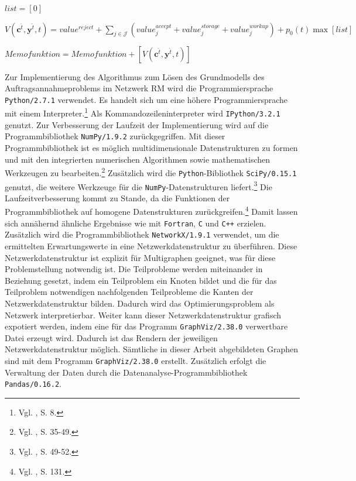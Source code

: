 \begin{algorithm}[H]
{{{			}
			$list = [0]$\\
			
		$V(\textbf{c}^{\hat t},\textbf{y}^{\hat t},t)=value^{reject} + \sum_{j\in\mathcal{J}}(value_j^{accept}+value_j^{storage}+value_j^{workup})+p_0(t)\max [list]$}
	$Memofunktion = Memofunktion+[V(\textbf{c}^{\hat t},\textbf{y}^{\hat t},t)]$}
\end{algorithm}

Zur Implementierung des Algorithmus zum Lösen des Grundmodells des Auftragsannahmeproblems im Netzwerk RM wird die Programmiersprache \texttt{Python/2.7.1} verwendet. Es handelt sich um eine höhere Programmiersprache mit einem Interpreter.\footnote{Vgl. \cite{:2005aa}, S. 8.} Als  Kommandozeileninterpreter wird \texttt{IPython/3.2.1} genutzt. Zur Verbesserung der Laufzeit der Implementierung wird auf die Programmbibliothek \texttt{NumPy/}\texttt{1.9.2} zurückgegriffen. Mit dieser Programmbibliothek ist es möglich multidimensionale Datenstrukturen zu formen und mit den integrierten numerischen Algorithmen sowie mathematischen Werkzeugen zu bearbeiten.\footnote{Vgl. \cite{lindblad2013numpy}, S. 35-49.} Zusätzlich wird die \texttt{Python}-Bibliothek \texttt{SciPy/0.15.1} genutzt, die weitere Werkzeuge für die \texttt{NumPy}-Datenstrukturen liefert.\footnote{Vgl. \cite{lindblad2013numpy}, S. 49-52.} Die Laufzeitverbesserung kommt zu Stande, da die Funktionen der Programmbibliothek auf homogene Datenstrukturen zurückgreifen.\footnote{Vgl. \cite{:2006aa}, S. 131.} Damit lassen sich annähernd ähnliche Ergebnisse wie mit \texttt{Fortran}, \texttt{C} und \texttt{C++} erzielen. Zusätzlich wird die Programmbibliothek \texttt{NetworkX/1.9.1} verwendet, um die ermittelten Erwartungswerte in eine Netzwerkdatenstruktur zu überführen. Diese Netzwerkdatenstruktur ist explizit für Multigraphen geeignet, was für diese Problemstellung notwendig ist. Die Teilprobleme werden miteinander in Beziehung gesetzt, indem ein Teilproblem ein Knoten bildet und die für das Teilproblem notwendigen nachfolgenden Teilprobleme die Kanten der Netzwerkdatenstruktur bilden. Dadurch wird das Optimierungsproblem als Netzwerk interpretierbar. Weiter kann dieser Netzwerkdatenstruktur grafisch expotiert werden, indem eine für das Programm \texttt{GraphViz/2.38.0} verwertbare Datei erzeugt wird. Dadurch ist das Rendern der jeweiligen Netzwerkdatenstruktur möglich. Sämtliche in dieser Arbeit abgebildeten Graphen sind mit dem Programm \texttt{GraphViz/2.38.0} erstellt. Zusätzlich erfolgt die Verwaltung der Daten durch die Datenanalyse-Programmbibliothek \texttt{Pandas/0.16.2}.


